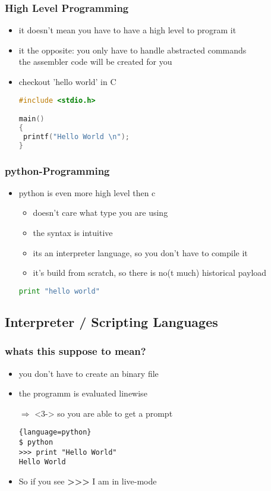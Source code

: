 \documentclass[handout]{beamer}
\begin{document}
		\begin{frame}[fragile]
			\frametitle{High Level Programming}
			\begin{itemize}
            	\item<1-> it doesn't mean you have to have a high level to program it
                \item<2-> it the opposite: you only have to handle abstracted commands \\
                          the assembler code will be created for you
                \item<3-> checkout 'hello world' in C
                \begin{lstlisting}[language=c]
#include <stdio.h>

main()
{
 printf("Hello World \n");
}
\end{lstlisting}
            \end{itemize}
		\end{frame}
		\begin{frame}[fragile]
			\frametitle{python-Programming}
			\begin{itemize}
            	\item<1-> python is even more high level then c
                \begin{itemize}
                    \item<2-> doesn't care what type you are using
                    \item<3-> the syntax is intuitive
                    \item<4-> its an interpreter language, so you don't have to compile it
                    \item<4-> it's build from scratch, so there is no(t much) historical payload
                \end{itemize}
                \begin{lstlisting}[language=python]
print "hello world"
\end{lstlisting}
            \end{itemize}
		\end{frame}

    \subsection{Interpreter / Scripting Languages} 
		\begin{frame}[fragile]
			\frametitle{whats this suppose to mean?}
			\begin{itemize}
                \item<1-> you don't have to create an binary file
                \item<2-> the programm is evaluated linewise
                \item[$\Rightarrow$]<3-> so you are able to get a prompt
                \begin{lstlisting}{language=python}
$ python
>>> print "Hello World"
Hello World
\end{lstlisting}
                \item<3-> So if you see \textbf{\textgreater \textgreater \textgreater} I am in live-mode
            \end{itemize}
		\end{frame}
\end{document}
